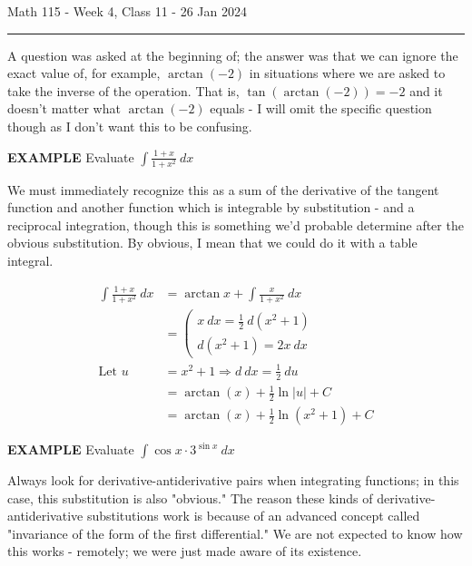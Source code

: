 \documentclass{article}
\begin{document}
Math 115 - Week 4, Class 11 - 26 Jan 2024
\hrule

\vspace{10pt}

A question was asked at the beginning of; the answer was that we can ignore the exact value of, for example, $\arctan(-2)$ in situations where we are asked to take the inverse of the operation. That is, $\tan(\arctan(-2))=-2$ and it doesn't matter what $\arctan(-2)$ equals - I will omit the specific question though as I don't want this to be confusing.

\vspace{10pt}

{\bf{}EXAMPLE} Evaluate $\displaystyle\int\frac{1+x}{1+x^2}\ dx$

\vspace{10pt}

We must immediately recognize this as a sum of the derivative of the tangent function and another function which is integrable by substitution - and a reciprocal integration, though this is something we'd probable determine after the obvious substitution. By obvious, I mean that we could do it with a table integral.

\begin{align*}
\int\frac{1+x}{1+x^2}\ dx&=\arctan x+\int\frac{x}{1+x^2}\ dx\\
&=\left(\begin{array}{c}x\ dx=\frac{1}{2}\ d(x^2+1)\\d(x^2+1)=2x\ dx\end{array}\right.\\
\mbox{Let }u&=x^2+1\Rightarrow d\ dx=\frac{1}{2}\ du\\
&=\arctan(x)+\frac{1}{2}\ln|u|+C\\
&=\arctan(x)+\frac{1}{2}\ln(x^2+1)+C
\end{align*}

\vspace{10pt}

{\bf{}EXAMPLE} Evaluate $\displaystyle\int\cos x\cdot3^{\sin x}\ dx$

\vspace{10pt}

Always look for derivative-antiderivative pairs when integrating functions; in this case, this substitution is also "obvious." The reason these kinds of derivative-antiderivative substitutions work is because of an advanced concept called "invariance of the form of the first differential." We are not expected to know how this works - remotely; we were just made aware of its existence.
\end{document}
